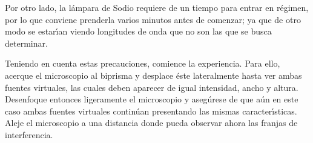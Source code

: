 \documentclass[laboratorio]{guia}
\begin{document}
Por otro lado, la l\'ampara de Sodio requiere de un tiempo para entrar en
r\'egimen, por lo que conviene prenderla varios minutos antes de comenzar; ya
que de otro modo se estar\'\i an viendo longitudes de onda que no son las que
se busca determinar.

Teniendo en cuenta estas precauciones, comience la experiencia. Para ello,
acerque el microscopio al biprisma y desplace \'este lateralmente hasta ver
ambas fuentes virtuales, las cuales deben aparecer de igual intensidad, ancho
y altura. Desenfoque entonces ligeramente el microscopio y aseg\'urese de que
a\'un en este caso ambas fuentes virtuales contin\'uan presentando las mismas
caracter\'\i sticas. Aleje el microscopio a una distancia donde pueda observar ahora las franjas de
interferencia.

\nocite{Alonso1998,Jenkins2001,Hecht1986}
 

        
\end{document}
